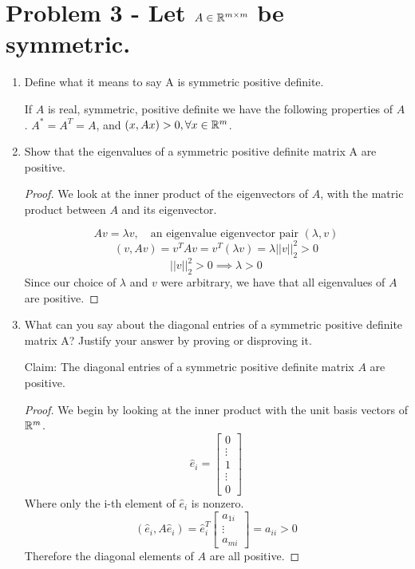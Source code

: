 \documentclass{article}
\begin{document}
\section{Problem 3 - Let $A \in \mathbb{R}^{m\times m}$ be symmetric.}
\begin{enumerate}
\item Define what it means to say A is symmetric positive definite.

If $A$ is real, symmetric, positive definite we have the following properties of $A$. $A^* = A^T = A$, and $(x, Ax) > 0, \forall x \in \mathbb{R}^m$. 


\item  Show that the eigenvalues of a symmetric positive definite matrix A are positive.


\begin{proof}

We look at the inner product of the eigenvectors of $A$, with the matric product between $A$ and its eigenvector. 

\[
    Av = \lambda v, \quad \text{an eigenvalue eigenvector pair } (\lambda, v)
\]
\[
    (v, Av) = v^TAv = v^T(\lambda v) = \lambda ||v||_2^2 > 0
\]
\[
    ||v||_2^2 > 0 \implies \lambda > 0
\]
Since our choice of $\lambda$ and $v$ were arbitrary, we have that all eigenvalues of $A$ are positive. 
\end{proof}


\item What can you say about the diagonal entries of a symmetric positive definite matrix
A? Justify your answer by proving or disproving it.

Claim: The diagonal entries of a symmetric positive definite matrix $A$ are positive. 

\begin{proof}
    We begin by looking at the inner product with the unit basis vectors of $\mathbb{R}^m$. 
    \[
        \hat{e}_i = \left[\begin{array}{c} 0\\\vdots\\1\\\vdots\\0\end{array}\right]
    \]
    Where only the i-th element of $\hat{e}_i$ is nonzero. 
    \[
        (\hat{e}_i, A\hat{e}_i) = \hat{e}_i^T \left[\begin{array}{c} a_{1i}\\\vdots\\a_{mi}\end{array}\right] = a_{ii} > 0 
    \]
    Therefore the diagonal elements of $A$ are all positive. 
\end{proof}

\end{enumerate}
\end{document}
